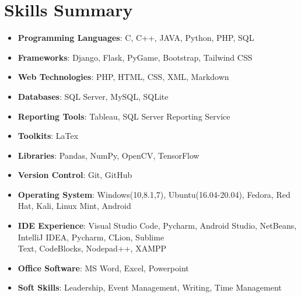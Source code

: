 \documentclass[a4paper,20pt]{article}
\newcommand{\resumeItem}[2]{
  \item\small{
    \textbf{#1}{: #2 \vspace{-2pt}}
  }
}
\newcommand{\resumeSubItem}[2]{\resumeItem{#1}{#2}\vspace{-3pt}}
\newcommand{\resumeSubHeadingListStart}{\begin{itemize}[leftmargin=*]}
\newcommand{\resumeSubHeadingListEnd}{\end{itemize}}
\begin{document}
\section{Skills Summary}
	\resumeSubHeadingListStart
	\resumeSubItem{Programming Languages}{C, C++, JAVA, Python, PHP, SQL}
	\resumeSubItem{Frameworks}{Django, Flask, PyGame, Bootstrap, Tailwind CSS}
	\resumeSubItem{Web Technologies}{PHP, HTML, CSS, XML, Markdown}
	\resumeSubItem{Databases}{SQL Server, MySQL, SQLite}
	\resumeSubItem{Reporting Tools}{Tableau, SQL Server Reporting Service}
	\resumeSubItem{Toolkits}{LaTex}
	\resumeSubItem{Libraries}{Pandas, NumPy, OpenCV, TensorFlow}
	\resumeSubItem{Version Control}{Git, GitHub}
	\resumeSubItem{Operating System}{Windows(10,8.1,7), Ubuntu(16.04-20.04), Fedora, Red Hat, Kali, Linux Mint, Android}
	\resumeSubItem{IDE Experience}{Visual Studio Code, Pycharm, Android Studio, NetBeans, IntelliJ IDEA, Pycharm, CLion, Sublime \\ \hspace{28mm} Text, CodeBlocks, Nodepad++, XAMPP}
	\resumeSubItem{Office Software}{MS Word, Excel, Powerpoint}
	\resumeSubItem{Soft Skills}{Leadership, Event Management, Writing, Time Management}

\resumeSubHeadingListEnd
\vspace{5pt}

\end{document}
